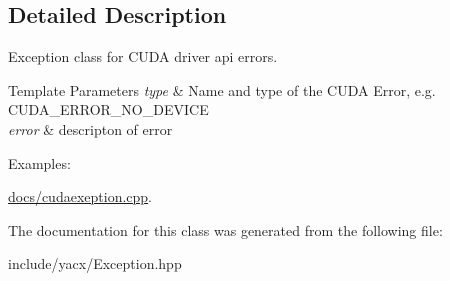 \subsection{Detailed Description}
Exception class for C\+U\+DA driver api errors. 


\begin{DoxyTemplParams}{Template Parameters}
{\em type} & Name and type of the C\+U\+DA Error, e.\+g. {\ttfamily C\+U\+D\+A\+\_\+\+E\+R\+R\+O\+R\+\_\+\+N\+O\+\_\+\+D\+E\+V\+I\+CE} \\
\hline
{\em error} & descripton of error \\
\hline
\end{DoxyTemplParams}
\begin{Desc}
\item[Examples\+: ]\par
\hyperlink{docs_2cudaexeption_8cpp-example}{docs/cudaexeption.\+cpp}.\end{Desc}


The documentation for this class was generated from the following file\+:\begin{DoxyCompactItemize}
\item 
include/yacx/Exception.\+hpp\end{DoxyCompactItemize}
